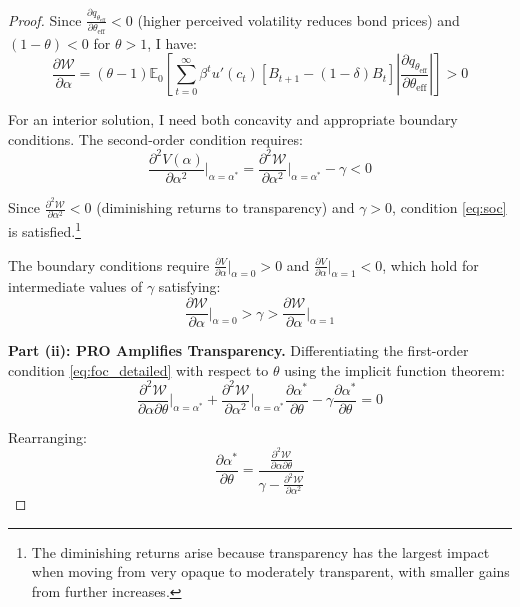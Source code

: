 \documentclass[12pt]{article}
\theoremstyle{plain}
\begin{document}
\begin{proof}
	Since $\frac{\partial q_{\theta_{\text{eff}}}}{\partial \theta_{\text{eff}}} <
		0$ (higher perceived volatility reduces bond prices) and $(1-\theta) < 0$ for
	$\theta > 1$, I have:
	\begin{equation}
		\frac{\partial \mathcal{W}}{\partial \alpha} = (\theta-1) \mathbb{E}_0 \left[ \sum_{t=0}^\infty \beta^t u'(c_t) [B_{t+1} - (1-\delta)B_t] \left|\frac{\partial q_{\theta_{\text{eff}}}}{\partial \theta_{\text{eff}}}\right| \right] > 0 \label{eq:marginal_benefit}
	\end{equation}

	For an interior solution, I need both concavity and appropriate boundary
	conditions. The second-order condition requires:
	\begin{equation}
		\frac{\partial^2 V(\alpha)}{\partial \alpha^2}\bigg|_{\alpha=\alpha^*} = \frac{\partial^2 \mathcal{W}}{\partial \alpha^2}\bigg|_{\alpha=\alpha^*} - \gamma < 0 \label{eq:soc}
	\end{equation}

	Since $\frac{\partial^2 \mathcal{W}}{\partial \alpha^2} < 0$ (diminishing
	returns to transparency) and $\gamma > 0$, condition \eqref{eq:soc} is
	satisfied.\footnote{The diminishing returns arise because transparency has the
		largest impact when moving from very opaque to moderately transparent, with
		smaller gains from further increases.}

	The boundary conditions require $\frac{\partial V}{\partial \alpha}|_{\alpha=0}
		> 0$ and $\frac{\partial V}{\partial \alpha}|_{\alpha=1} < 0$, which hold for
	intermediate values of $\gamma$ satisfying:
	\begin{equation}
		\frac{\partial \mathcal{W}}{\partial \alpha}\bigg|_{\alpha=0} > \gamma > \frac{\partial \mathcal{W}}{\partial \alpha}\bigg|_{\alpha=1} \label{eq:gamma_bounds}
	\end{equation}

	\textbf{Part (ii): PRO Amplifies Transparency.}
	Differentiating the first-order condition \eqref{eq:foc_detailed} with respect to $\theta$ using the implicit function theorem:
	\begin{equation}
		\frac{\partial^2 \mathcal{W}}{\partial \alpha \partial \theta}\bigg|_{\alpha=\alpha^*} + \frac{\partial^2 \mathcal{W}}{\partial \alpha^2}\bigg|_{\alpha=\alpha^*} \frac{\partial \alpha^*}{\partial \theta} - \gamma \frac{\partial \alpha^*}{\partial \theta} = 0 \label{eq:ift_application}
	\end{equation}

	Rearranging:
	\begin{equation}
		\frac{\partial \alpha^*}{\partial \theta} = \frac{\frac{\partial^2 \mathcal{W}}{\partial \alpha \partial \theta}}{\gamma - \frac{\partial^2 \mathcal{W}}{\partial \alpha^2}} \label{eq:transparency_theta_derivative}
	\end{equation}


\end{proof}
\end{document}
